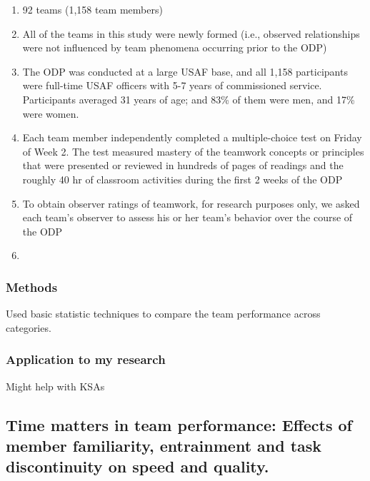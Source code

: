 \documentclass[12pt]{article}
\begin{document}
\begin{enumerate}
    \item 92 teams (1,158 team members)
    \item All of the teams in this study were newly formed (i.e., observed relationships were not influenced by team phenomena occurring prior to the ODP)
    \item The ODP was conducted at a large USAF base, and all 1,158 participants were full-time USAF officers with 5-7 years of commissioned service. Participants averaged 31 years of age; and 83\% of them were men, and 17\% were women.
    \item Each team member independently completed a multiple-choice test on Friday of Week 2. The test measured mastery of the teamwork concepts or principles that were presented or reviewed in hundreds of pages of readings and the roughly 40 hr of classroom activities during the first 2 weeks of the ODP
    \item To obtain observer ratings of teamwork, for research purposes only, we asked each team’s observer to assess his or her team’s behavior over the course of the ODP
    \item 
\end{enumerate}

\subsubsection*{Methods}

Used basic statistic techniques to compare the team performance across categories.

\subsubsection*{Application to my research}

Might help with KSAs


\subsection*{Time matters in team performance: Effects of member familiarity, entrainment and task discontinuity on speed and quality.\cite{time_matters}}
\end{document}
